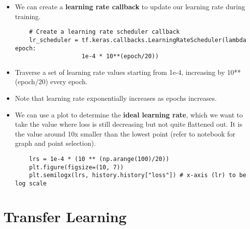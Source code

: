 \documentclass[11pt, a4paper]{article}
\begin{document}
	\begin{itemize}
		\item We can create a \textbf{learning rate callback} to update our learning rate during training.
	\begin{lstlisting}
	# Create a learning rate scheduler callback
	lr_scheduler = tf.keras.callbacks.LearningRateScheduler(lambda epoch: 
	               1e-4 * 10**(epoch/20)) \end{lstlisting}
		\item Traverse a set of learning rate values starting from 1e-4, increasing by 10**(epoch/20) every epoch.
		\item Note that learning rate exponentially increases as epochs increases.
		\item We can use a plot to determine the \textbf{ideal learning rate}, which we want to take the value where loss is still decreasing but not quite flattened out. It is the value around 10x smaller than the lowest point (refer to notebook for graph and point selection).
	\begin{lstlisting}
	lrs = 1e-4 * (10 ** (np.arange(100)/20))
	plt.figure(figsize=(10, 7))
	plt.semilogx(lrs, history.history["loss"]) # x-axis (lr) to be log scale \end{lstlisting}
	\end{itemize} \newpage

	
	\section{Transfer Learning}
\end{document}
